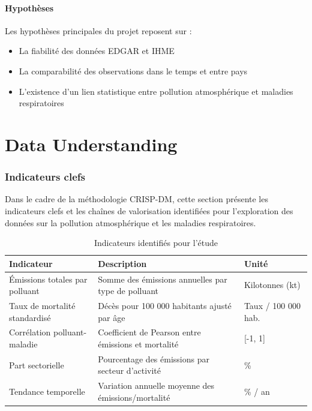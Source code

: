 \documentclass[11pt,a4paper]{article}
\newcommand{\currentpart}{}
\let\oldpart\part
\renewcommand{\part}[1]{%
  \oldpart{#1}%
  \renewcommand{\currentpart}{\thepart.\ #1}%
  \markboth{\currentpart}{}%
}
\begin{document}
\subsection{Hypothèses}

Les hypothèses principales du projet reposent sur :
\begin{itemize}[noitemsep]
    \item La fiabilité des données EDGAR et IHME
    \item La comparabilité des observations dans le temps et entre pays
    \item L'existence d'un lien statistique entre pollution atmosphérique et maladies respiratoires
\end{itemize}

\clearpage
\part{Data Understanding}

\section{Indicateurs clefs}

Dans le cadre de la méthodologie CRISP-DM, cette section présente les indicateurs clefs et les chaînes de valorisation identifiées pour l'exploration des données sur la pollution atmosphérique et les maladies respiratoires.


\begin{table}[H]
\centering
\caption{Indicateurs identifiés pour l'étude}
\begin{tabular}{p{4cm}p{6cm}p{4cm}}
\toprule
\textbf{Indicateur} & \textbf{Description} & \textbf{Unité} \\
\midrule
Émissions totales par polluant & Somme des émissions annuelles par type de polluant & Kilotonnes (kt) \\
Taux de mortalité standardisé & Décès pour 100 000 habitants ajusté par âge & Taux / 100 000 hab. \\
Corrélation polluant-maladie & Coefficient de Pearson entre émissions et mortalité & [-1, 1] \\
Part sectorielle & Pourcentage des émissions par secteur d'activité & \% \\
Tendance temporelle & Variation annuelle moyenne des émissions/mortalité & \% / an \\
\bottomrule
\end{tabular}
\end{table}
\end{document}
